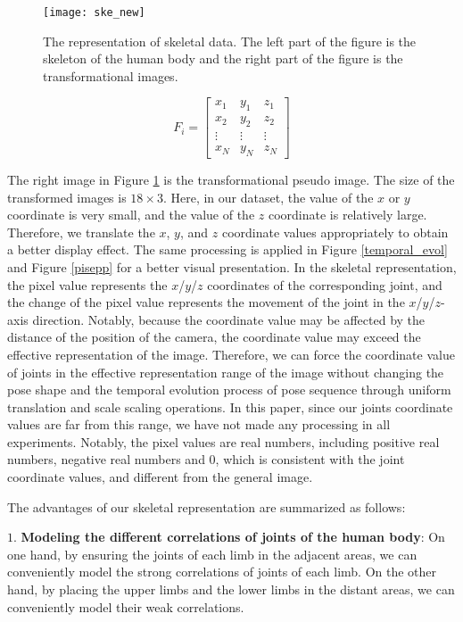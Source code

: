 \documentclass[journal]{IEEEtran}
\begin{document}
\begin{figure}[!t]
\centering
\texttt{[image: ske\_new]}
\caption{The representation of skeletal data. The left part of the figure is the skeleton of the human body and the right part of the figure is the transformational images. }
\label{ske_new}
\end{figure}

\begin{equation}
\label{eqn1}
{F_i} = \left[ {\begin{array}{*{20}{c}}
{{x_1}}&{{y_1}}&{{z_1}}\\
{{x_2}}&{{y_2}}&{{z_2}}\\
 \vdots & \vdots & \vdots \\
{{x_N}}&{{y_N}}&{{z_N}}
\end{array}} \right]
\end{equation}

The right image in Figure \ref{ske_new} is the transformational pseudo image. The size of the transformed images is ${18 \times 3}$. Here, in our dataset, the value of the ${x}$ or ${y}$ coordinate is very small, and the value of the ${z}$ coordinate is relatively large. Therefore, we translate the ${x}$, ${y}$, and ${z}$ coordinate values appropriately to obtain a better display effect. The same processing is applied in Figure \ref{temporal_evol} and Figure \ref{pisepp} for a better visual presentation. In the skeletal representation, the pixel value represents the ${x}$/${y}$/${z}$ coordinates of the corresponding joint, and the change of the pixel value represents the movement of the joint in the ${x}$/${y}$/${z}$-axis direction. Notably, because the coordinate value may be affected by the distance of the position of the camera, the coordinate value may exceed the effective representation of the image. Therefore, we can force the coordinate value of joints in the effective representation range of the image without changing the pose shape and the temporal evolution process of pose sequence through uniform translation and scale scaling operations. In this paper, since our joints coordinate values are far from this range, we have not made any processing in all experiments. Notably, the pixel values are real numbers, including positive real numbers, negative real numbers and ${0}$, which is consistent with the joint coordinate values, and different from the general image.

The advantages of our skeletal representation are summarized as follows:

${1}$.	{\bf Modeling the different correlations of joints of the human body}: On one hand, by ensuring the joints of each limb in the adjacent areas, we can conveniently model the strong correlations of joints of each limb. On the other hand, by placing the upper limbs and the lower limbs in the distant areas, we can conveniently model their weak correlations.
\end{document}
